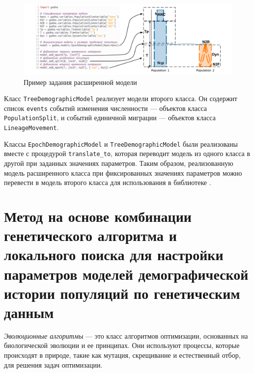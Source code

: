 \begin{figure}[ht]
    \centering
    \includegraphics[width=\textwidth]{images_2/gadma_model.pdf}
    \caption{Пример задания расширенной модели}
    \label{fig:new_model:model_spec}
\end{figure}

Класс \texttt{TreeDemographicModel} реализует модели второго класса.
Он содержит список \texttt{events} событий изменения численности --- объектов класса \texttt{PopulationSplit}, и событий единичной миграции --- объектов класса \texttt{LineageMovement}.

Классы \texttt{EpochDemographicModel} и \texttt{TreeDemographicModel} были реализованы вместе с процедурой \texttt{translate\_to}, которая переводит модель из одного класса в другой при заданных значениях параметров.
Таким образом, реализованную модель расширенного класса при фиксированных значениях параметров можно перевести в модель второго класса для использования в библиотеке \momi.



\FloatBarrier
\section{Метод на основе комбинации генетического алгоритма и локального поиска для настройки параметров моделей демографической истории популяций по генетическим данным}
\label{sec:part2:genenic_algorithm}

\emph{Эволюционные алгоритмы} --- это класс алгоритмов оптимизации, основанных на биологической эволюции и ее принципах.
Они используют процессы, которые происходят в природе, такие как мутация, скрещивание и естественный отбор, для решения задач оптимизации.

